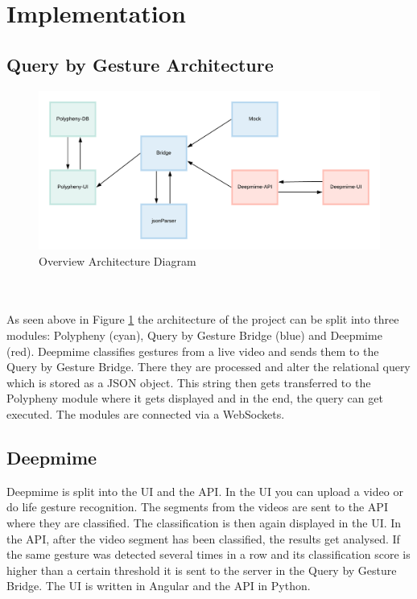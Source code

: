 \section{Implementation}
\label{g1:sec:implementation}  %

\subsection{Query by Gesture Architecture}
\begin{figure}[H]
    \centering
    \includegraphics[width=\textwidth]{reportContent/images/QBG-Bridge.png}
    \caption{Overview Architecture Diagram}
    \label{fig:overall_architecture}
\end{figure}{}

\\
\\
As seen above in Figure \ref{fig:overall_architecture} the architecture of the project can be split into three modules: Polypheny (cyan), Query by Gesture Bridge (blue) and Deepmime (red).
Deepmime classifies gestures from a live video and sends them to the Query by Gesture Bridge. There they are processed and alter the relational query which is stored as a JSON object. This string then gets transferred to the Polypheny module where it gets displayed and in the end, the query can get executed. The modules are connected via a WebSockets. 

\subsection{Deepmime}
Deepmime is split into the UI and the API. In the UI you can upload a video or do life gesture recognition. The segments from the videos are sent to the API where they are classified. The classification is then again displayed in the UI.
In the API, after the video segment has been classified, the results get analysed. If the same gesture was detected several times in a row and its classification score is higher than a certain threshold it is sent to the server in the Query by Gesture Bridge. The UI is written in Angular and the API in Python.

